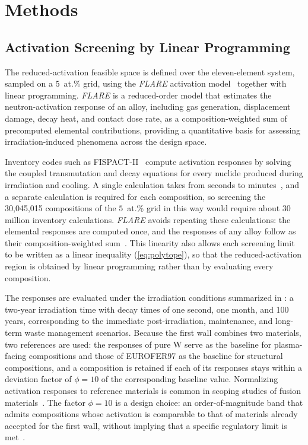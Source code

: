 \section{Methods}
\label{sec:methods}

\subsection{Activation Screening by Linear Programming}
\label{sec:feasible-space}

The reduced-activation feasible space is defined over the eleven-element
 system, sampled on a \(5\)~at.\% grid, using
the \emph{FLARE} activation model~\cite{Marquez2026FLARE} together with linear
programming. \emph{FLARE} is a reduced-order model that estimates the
neutron-activation response of an alloy, including gas generation, displacement
damage, decay heat, and contact dose rate, as a composition-weighted sum of
precomputed elemental contributions, providing a quantitative basis for assessing
irradiation-induced phenomena across the design space.

Inventory codes such as FISPACT-II~\cite{sublet2017fispact} compute activation
responses by solving the coupled transmutation and decay equations for every
nuclide produced during irradiation and cooling. A single calculation takes from
seconds to minutes~\cite{rsicc2020fispact}, and a separate calculation is required
for each composition, so screening the 30,045,015 compositions of the
\(5\)~at.\% grid in this way would require about 30 million inventory
calculations. \emph{FLARE} avoids repeating these calculations: the elemental
responses are computed once, and the responses of any alloy follow as their
composition-weighted sum~\cite{Marquez2026FLARE}. This linearity also allows each
screening limit to be written as a linear inequality (\cref{eq:polytope}), so that
the reduced-activation region is obtained by linear programming rather than by
evaluating every composition.

The responses are evaluated under the irradiation conditions summarized in
: a two-year irradiation time with decay times of one
second, one month, and 100 years, corresponding to the immediate post-irradiation,
maintenance, and long-term waste management scenarios. Because the first wall
combines two materials, two references are used: the responses of pure W serve as
the baseline for plasma-facing compositions and those of EUROFER97 as the baseline
for structural compositions, and a composition is retained if each of its responses
stays within a deviation factor of \(\phi=10\) of the corresponding baseline value.
Normalizing activation responses to reference materials is common in scoping
studies of fusion materials~\cite{gilbert2017automated,gilbert2017waste}. The factor
\(\phi=10\) is a design choice: an order-of-magnitude band that admits compositions
whose activation is comparable to that of materials already accepted for the
first wall, without implying that a specific regulatory limit is
met~\cite{rocco1991criteria}.

